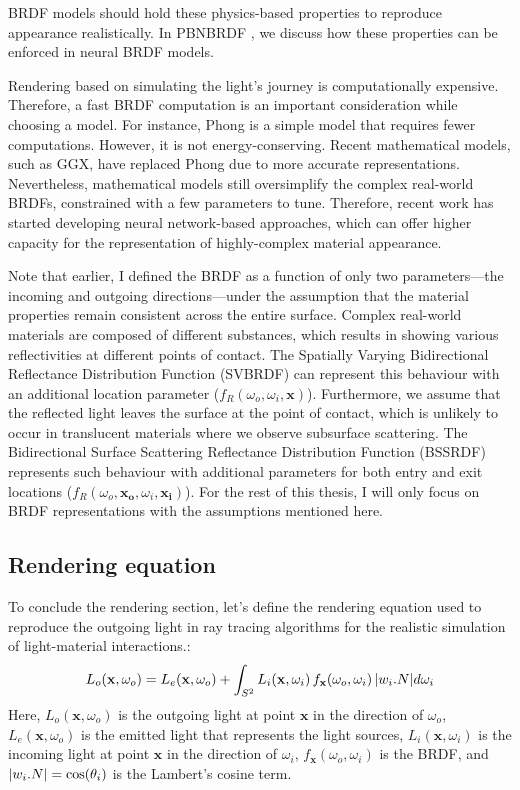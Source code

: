 \gls{BRDF} models should hold these physics-based properties to reproduce appearance realistically. In PBNBRDF \cite{pbnbrdf}, we discuss how these properties can be enforced in neural \gls{BRDF} models. 

Rendering based on simulating the light's journey is computationally expensive. Therefore, a fast \gls{BRDF} computation is an important consideration while choosing a model. For instance, Phong is a simple model that requires fewer computations. However, it is not energy-conserving. Recent mathematical models, such as GGX, have replaced Phong due to more accurate representations. Nevertheless, mathematical models still oversimplify the complex real-world \gls{BRDF}s, constrained with a few parameters to tune. Therefore, recent work has started developing neural network-based approaches, which can offer higher capacity for the representation of highly-complex material appearance.

Note that earlier, I defined the \gls{BRDF} as a function of only two parameters—the incoming and outgoing directions—under the assumption that the material properties remain consistent across the entire surface. Complex real-world materials are composed of different substances, which results in showing various reflectivities at different points of contact. The Spatially Varying Bidirectional Reflectance Distribution Function (\gls{SVBRDF}) can represent this behaviour with an additional location parameter ($f_R(\omega_o, \omega_i,  \mathbf{x})$). Furthermore, we assume that the reflected light leaves the surface at the point of contact, which is unlikely to occur in translucent materials where we observe subsurface scattering. The Bidirectional Surface Scattering Reflectance Distribution Function (\gls{BSSRDF}) represents such behaviour with additional parameters for both entry and exit locations ($f_R(\omega_o, \mathbf{x_o}, \omega_i,  \mathbf{x_i})$). For the rest of this thesis, I will only focus on \gls{BRDF} representations with the assumptions mentioned here.

\subsection{Rendering equation}

To conclude the rendering section, let's define the rendering equation used to reproduce the outgoing light in ray tracing algorithms for the realistic simulation of light-material interactions.:
\begin{equation}
L_o(\mathbf{x}, \omega_o) = L_e(\mathbf{x}, \omega_o)  +  \int_{S^2} L_i(\mathbf{x}, \omega_i) \, f_{\mathbf{x}}(\omega_o,  \omega_i) \, \lvert w_i . N\rvert d\omega_i
\label{eqn:rendering-eqn}
\end{equation}
Here, $L_o(\mathbf{x}, \omega_o) $ is the outgoing light at point $\mathbf{x}$ in the direction of $\omega_o$, $L_e(\mathbf{x}, \omega_o)$ is the emitted light that represents the light sources, $L_i(\mathbf{x}, \omega_i) $ is the incoming light at point $\mathbf{x}$ in the direction of $\omega_i$, $f_{\mathbf{x}}(\omega_o,  \omega_i)$ is the \gls{BRDF}, and $\lvert w_i . N\rvert = \cos(\theta_i)$ is the Lambert's cosine term.

